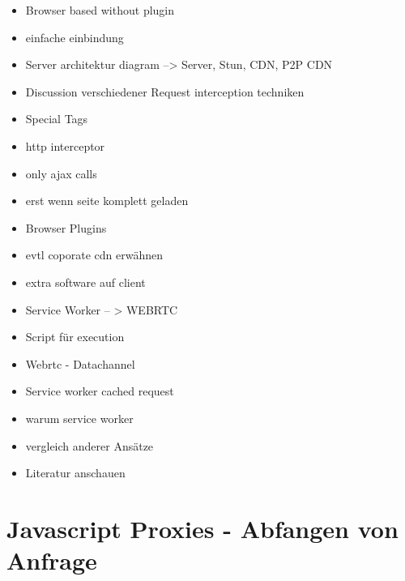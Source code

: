 \begin{itemize}
	\item Browser based without plugin
	\item einfache einbindung
	\item Server architektur diagram --> Server, Stun, CDN, P2P CDN
	\item Discussion verschiedener Request interception techniken
	\item Special Tags
	\item http interceptor
	\item 	only ajax calls
	\item 	erst wenn seite komplett geladen
	\item Browser Plugins
	\item evtl coporate cdn erwähnen
	\item extra software auf client
	\item Service Worker -- > WEBRTC
	\item Script für execution
	\item Webrtc - Datachannel
	\item Service worker cached request
	\item warum service worker
	\item 	vergleich anderer Ansätze
	\item 	Literatur anschauen
\end{itemize}
%
%

\section{Javascript Proxies - Abfangen von Anfrage}

